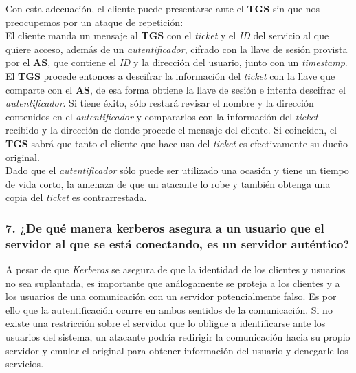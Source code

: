 \documentclass[12pt]{article}
\begin{document}
Con esta adecuación, el cliente puede presentarse ante el \textbf{TGS} sin que nos preocupemos por un ataque de repetición:\\
El cliente manda un mensaje al \textbf{TGS} con el \textit{ticket} y el \textit{ID} del servicio al que quiere acceso, además de un \textit{autentificador}, cifrado con la llave de sesión provista por el \textbf{AS}, que contiene el \textit{ID} y la dirección del usuario, junto con un \textit{timestamp}. El \textbf{TGS} procede entonces a descifrar la información del \textit{ticket} con la llave que comparte con el \textbf{AS}, de esa forma
obtiene la llave de sesión e intenta descifrar el \textit{autentificador}. Si tiene éxito, sólo restará revisar el nombre y la dirección contenidos
en el \textit{autentificador} y compararlos con la información del \textit{ticket} recibido y la dirección de donde procede el mensaje del cliente.
Si coinciden, el \textbf{TGS} sabrá que tanto el cliente que hace uso del \textit{ticket} es efectivamente su dueño original. \\

Dado que el \textit{autentificador} sólo puede ser utilizado una ocasión y tiene un tiempo de vida corto, la amenaza de que un atacante lo robe y también obtenga una copia del \textit{ticket} es contrarrestada.




\subsubsection*{7. ¿De qué manera kerberos asegura a un usuario que el servidor al que se está conectando, es un 
  servidor auténtico?}
A pesar de que \textit{Kerberos} se asegura de que la identidad de los clientes y usuarios no sea suplantada, es importante que análogamente se proteja a los clientes y a los usuarios de una comunicación con un servidor potencialmente falso. Es por ello que la autentificación ocurre en ambos
sentidos de la comunicación. Si no existe una restricción sobre el servidor que lo obligue a identificarse ante los usuarios del sistema, un atacante podría redirigir la comunicación hacia su propio servidor y emular el original para obtener información del usuario y denegarle los servicios.\\
\end{document}

